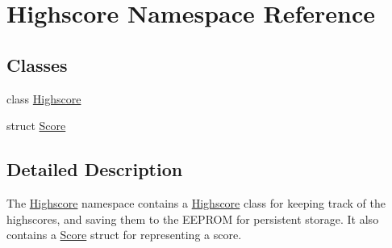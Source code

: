 \hypertarget{namespace_highscore}{}\section{Highscore Namespace Reference}
\label{namespace_highscore}
\subsection*{Classes}
\begin{DoxyCompactItemize}
\item 
class \hyperlink{class_highscore_1_1_highscore}{Highscore}
\item 
struct \hyperlink{struct_highscore_1_1_score}{Score}
\end{DoxyCompactItemize}


\subsection{Detailed Description}
The \hyperlink{namespace_highscore}{Highscore} namespace contains a \hyperlink{namespace_highscore}{Highscore} class for keeping track of the highscores, and saving them to the E\+E\+P\+R\+OM for persistent storage. It also contains a \hyperlink{struct_highscore_1_1_score}{Score} struct for representing a score. 